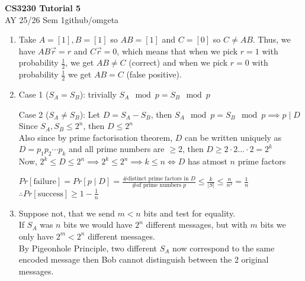 \documentclass[12pt, a4paper]{article}
\newcommand{\mytitle}{CS3230 Tutorial 5}
\newcommand{\myauthor}{github/omgeta}
\newcommand{\mydate}{AY 25/26 Sem 1}
\begin{document}
\raggedright
\footnotesize
\begin{center}
{\normalsize{\textbf{\mytitle}}} \\
{\footnotesize{\mydate\hspace{2pt}\textemdash\hspace{2pt}\myauthor}}
\end{center}
\begin{enumerate}[Q\arabic*).]
  \item Take $\displaystyle A = [1], B = [1]$ so $AB = [1]$ and $C = [0]$ so $C \neq AB$. Thus, we have $AB \vec{r} = r$  and $C \vec{r} = 0$, which means that when we pick $r = 1$ with probability $\frac{1}{2}$, we get $AB \neq C$ (correct) and when we pick $r = 0$ with probability $\frac{1}{2}$ we get $AB = C$ (false positive). 

  \item Case 1 ($S_A = S_B$): trivially $S_A \mod p = S_B \mod p$

    Case 2 ($S_A \neq S_B$): Let $D = S_A - S_B$, then $S_A \mod p = S_B \mod p \implies p \mid D$\\
    Since $S_A, S_B \leq 2^n$, then $D \leq 2^n$\\
    Also since by prime factorisation theorem, $D$ can be written uniquely as $D = p_1p_2\cdots p_k$ and all prime numbers are $\geq 2$, then $D \geq 2\cdot 2 \ldots \cdot 2 = 2^k$\\
    Now, $2^k \leq D \leq 2^n \implies 2^k \leq 2^n \implies k \leq n \iff D$ has atmost $n$ prime factors 

    $Pr[\text{failure}] = Pr[p \mid D] = \frac{\text{\# distinct prime factors in $D$}}{\text{\# of prime numbers }p} \leq \frac{k}{|S|} \leq \frac{n}{n^2} = \frac{1}{n}$\\
    $\therefore Pr[\text{success}] \geq 1 - \frac{1}{n}$

  \item Suppose not, that we send $m < n$ bits and test for equality.\\
    If $S_A$ was $n$ bits we would have $2^{n}$ different messages, but with $m$ bits we only have $2^{m} < 2^{n}$ different messages.\\
    By Pigeonhole Principle, two different $S_A$ now correspond to the same encoded message then Bob cannot distinguish between the 2 original messages.


\end{enumerate}
\end{document}
